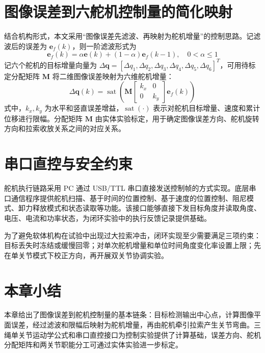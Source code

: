 \documentclass[UTF8,zihao=-4,oneside]{ctexrep}
\begin{document}
\section{图像误差到六舵机控制量的简化映射}

结合机构形式，本文采用“图像误差先滤波、再映射为舵机增量”的控制思路。记滤波后的误差为 \(\mathbf{e}_f(k)\)，则一阶滤波形式为
\begin{equation}
  \mathbf{e}_f(k)=\alpha\mathbf{e}(k)+(1-\alpha)\mathbf{e}_f(k-1),\quad 0<\alpha\leq 1
\end{equation}
记六个舵机的目标增量向量为 \(\Delta\mathbf{q}=[\Delta q_1,\Delta q_2,\Delta q_3,\Delta q_4,\Delta q_5,\Delta q_6]^T\)，可用待标定分配矩阵 \(\mathbf{M}\) 将二维图像误差映射为六维舵机增量：
\begin{equation}
  \Delta\mathbf{q}(k)=\operatorname{sat}\left(\mathbf{M}
  \begin{bmatrix}
    k_x & 0 \\
    0 & k_y
  \end{bmatrix}
  \mathbf{e}_f(k)\right)
\end{equation}
式中，\(k_x,k_y\) 为水平和竖直误差增益，\(\operatorname{sat}(\cdot)\) 表示对舵机目标增量、速度和累计位移进行限幅。分配矩阵 \(\mathbf{M}\) 由实体实验标定，用于确定图像误差方向、舵机旋转方向和拉索收放关系之间的对应关系。

\section{串口直控与安全约束}

舵机执行链路采用 PC 通过 USB/TTL 串口直接发送控制帧的方式实现。底层串口通信程序提供舵机扫描、基于时间的位置控制、基于速度的位置控制、阻尼模式、卸力释放模式和状态读取等功能。该接口能够直接下发目标角度并读取角度、电压、电流和功率状态，为闭环实验中的执行反馈记录提供基础。

为了避免软体机构在试验中出现过大拉索冲击，闭环实现至少需要满足三项约束：目标丢失时冻结或缓慢回零；对单次舵机增量和单位时间角度变化率设置上限；先在单关节模式下校正方向，再开展双关节协调实验。

\section{本章小结}

本章给出了图像误差到舵机控制量的基本链条：目标检测输出中心点，计算图像平面误差，经过滤波和限幅后映射为舵机增量，再由舵机牵引拉索产生关节弯曲。三绳单关节运动学公式和串口直控接口为控制实验提供了计算基础，误差方向、舵机分配矩阵和两关节职能分工可通过实体实验进一步标定。
\end{document}
